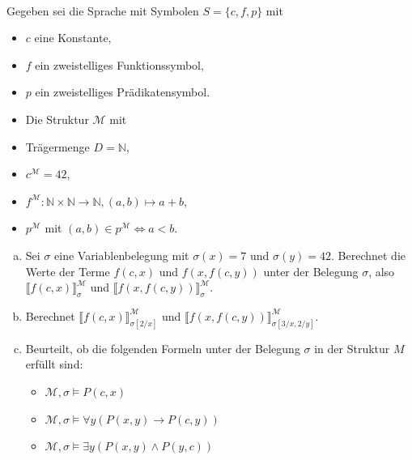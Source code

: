 \\
Gegeben sei die Sprache mit Symbolen $S=\{c,f,p\}$ mit
\begin{itemize}
  \item $c$ eine Konstante,
  \item $f$ ein zweistelliges Funktionssymbol,
  \item $p$ ein zweistelliges Prädikatensymbol.
  \item Die Struktur $\mathcal{M}$ mit
  \item Trägermenge $D=\mathbb{N}$,
  \item $c^\mathcal{M}=42$,
  \item $f^\mathcal{M}:\mathbb{N}\times\mathbb{N}\to\mathbb{N}, (a,b)\mapsto a+b$,
  \item $p^\mathcal{M}$ mit $(a,b)\in p^\mathcal{M} \Leftrightarrow a<b$.
\end{itemize}
\begin{enumerate}[a)]
  \item Sei $\sigma$ eine Variablenbelegung mit $\sigma(x)=7$ und $\sigma(y)=42$. Berechnet die Werte der Terme $f(c,x)$ und $f(x,f(c,y))$ unter der Belegung $\sigma$, also $\llbracket f(c,x) \rrbracket^\mathcal{M}_\sigma$ und $\llbracket f(x,f(c,y)) \rrbracket^\mathcal{M}_\sigma$.
  \item Berechnet $\llbracket f(c,x) \rrbracket^\mathcal{M}_{\sigma[2/x]}$ und $\llbracket f(x,f(c,y)) \rrbracket^\mathcal{M}_{\sigma[3/x,2/y]}$.
  \item Beurteilt, ob die folgenden Formeln unter der Belegung $\sigma$ in der Struktur $M$ erfüllt sind:
  \begin{itemize}
    \item $\mathcal{M},\sigma\models P(c,x)$
    \item $\mathcal{M},\sigma\models\forall y(P(x,y)\to P(c,y))$
    \item $\mathcal{M},\sigma\models\exists y(P(x,y)\wedge P(y,c))$
  \end{itemize}
\end{enumerate}

